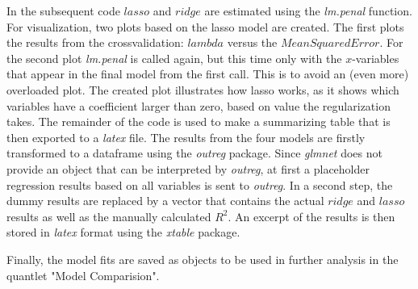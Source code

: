 In the subsequent code $lasso$ and $ridge$ are estimated using the \textit{lm.penal} function.  For visualization, two plots based on the lasso model are created. The first plots the results from the crossvalidation: $lambda$ versus the $Mean Squared Error$. For the second plot \textit{lm.penal} is called again, but this time only with the $x$-variables that appear in the final model from the first call. This is to avoid an (even more) overloaded plot. The created plot illustrates how lasso works, as it shows which variables have a coefficient larger than zero, based on value  the regularization takes. 
The remainder of the code is used to make a summarizing table that is then exported to  a \textit{latex} file. The results from the four models are firstly transformed to a dataframe using the \textit{outreg} package. Since \textit{glmnet} does not provide  an object that can be interpreted by \textit{outreg}, at first a placeholder regression results based on all variables is sent to \textit{outreg}. In a second step, the dummy results are replaced by a vector that contains the actual $ridge$ and $lasso$ results as well as the manually calculated $R^{2}$.  An excerpt of the results is then stored in \textit{latex} format using the \textit{xtable} package. 

Finally, the model fits are saved as objects to be used in further analysis in the quantlet "Model Comparision". 

